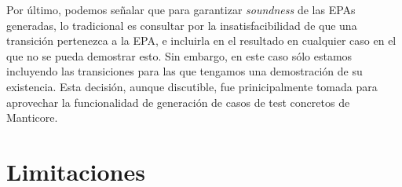 Por último, podemos señalar que para garantizar \textit{soundness} de las EPAs generadas, lo tradicional es consultar por la insatisfacibilidad de que una transición pertenezca a la EPA, e incluirla en el resultado en cualquier caso en el que no se pueda demostrar esto.
Sin embargo, en este caso sólo estamos incluyendo las transiciones para las que tengamos una demostración de su existencia.
Esta decisión, aunque discutible, fue prinicipalmente tomada para aprovechar la funcionalidad de generación de casos de test concretos de Manticore.




\section{Limitaciones}
\label{sec:subaproximacion}
